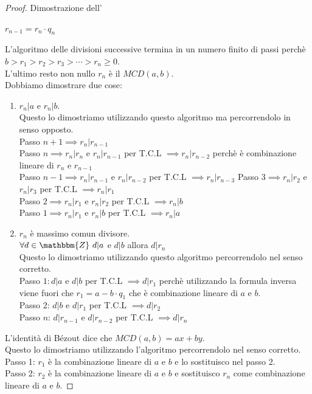 \documentclass[12pt, letterpaper]{report}
\newcommand{\namerefl}[1]{%
	\bgroup
	\let\nmu\MakeLowercase
	\nameref{#1}\egroup}
\newcommand{\nmu}{}
\begin{document}
\begin{proof}{Dimostrazione dell'\namerefl{th:Bézout}}
\begin{enumerate}
				$r_{n - 1} = r_{n} \cdot q_{n}$
			\end{enumerate}
			L'algoritmo delle divisioni successive termina in un numero finito di passi perchè $b > r_1 > r_2 > r_3 > \cdots > r_n \geq 0$. \\
			L'ultimo resto non nullo $r_n$ è il $MCD(a,b)$. \\
			Dobbiamo dimostrare due cose:
			\begin{enumerate}
				\item $r_n|a$ e $r_n|b$. \\
				Questo lo dimostriamo utilizzando questo algoritmo ma percorrendolo in senso opposto. \\
				Passo $n + 1 \implies r_n | r_{n - 1}$ \\
				Passo $n \implies r_n | r_n $ e $r_{n}|r_{n - 1}$ per T.C.L $\implies r_n | r_{n - 2}$ perchè è combinazione lineare di $r_n$ e $r_{n - 1}$ \\
				Passo $n - 1 \implies r_n | r_{n - 1}$ e $r_n | r_{n - 2}$ per T.C.L $\implies r_n | r_{n - 3}$
				Passo $3 \implies r_n | r_2$ e $r_n | r_3$ per T.C.L $\implies r_n | r_1$ \\
				Passo $2 \implies r_n | r_1$ e $r_n|r_2$ per T.C.L $\implies r_n | b$ \\
				Passo $1 \implies r_n | r_1$ e $r_n | b$ per T.C.L $\implies r_n | a$
				\item $r_n$ è massimo comun divisore. \\
				$\forall d \in \mathbbm{Z}\ d|a$ e $d|b$ allora $d|r_n$ \\
				Questo lo dimostriamo utilizzando questo algoritmo percorrendolo nel senso corretto. \\
				Passo $1: d|a$ e $d|b$ per T.C.L $\implies d|r_1$ perchè utilizzando la formula inversa viene fuori che $r_1 = a - b \cdot q_1$ che è combinazione lineare di $a$ e $b$.  \\
				Passo 2: $d|b$ e $d|r_1$ per T.C.L $\implies d | r_2$ \\
				Passo $n$: $d|r_{n - 1}$ e $d|r_{n - 2}$ per T.C.L $\implies d|r_n$
			\end{enumerate}
			L'identità di Bézout dice che $MCD(a,b) = ax + by$. \\
			Questo lo dimostriamo utilizzando l'algoritmo percorrendolo nel senso corretto. \\
			Passo 1: $r_1$ è la combinazione lineare di $a$ e $b$ e lo sostituisco nel passo 2. \\
			Passo 2: $r_2$ è la combinazione lineare di $a$ e $b$ e sostituisco $r_n$ come combinazione lineare di $a$ e $b$.
		\end{proof}
\end{document}
